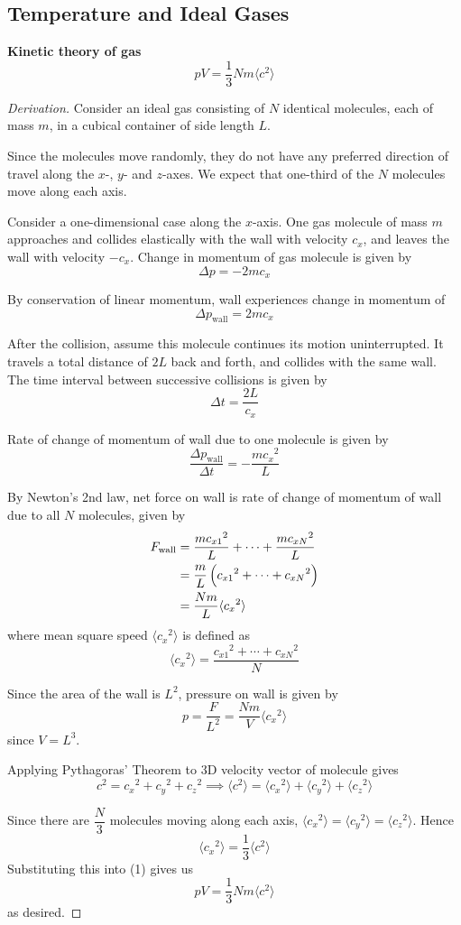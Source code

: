 \subsection{Temperature and Ideal Gases}
\textbf{Kinetic theory of gas}
\[ pV = \frac{1}{3} Nm \langle c^2 \rangle \]
\begin{proof}[Derivation]
Consider an ideal gas consisting of $N$ identical molecules, each of mass $m$, in a cubical container of side length $L$.

Since the molecules move randomly, they do not have any preferred direction of travel along the $x$-, $y$- and $z$-axes. We expect that one-third of the $N$ molecules move along each axis.

Consider a one-dimensional case along the $x$-axis. One gas molecule of mass $m$ approaches and collides elastically with the wall with velocity $c_x$, and leaves the wall with velocity $-c_x$. Change in momentum of gas molecule is given by 
\[ \Delta p = -2mc_x \]

By conservation of linear momentum, wall experiences change in momentum of
\[ \Delta p_\text{wall} = 2mc_x \]

After the collision, assume this molecule continues its motion uninterrupted. It travels a total distance of $2L$ back and forth, and collides with the same wall. The time interval between successive collisions is given by 
\[ \Delta t = \frac{2L}{c_x} \]

Rate of change of momentum of wall due to one molecule is given by 
\[ \frac{\Delta p_\text{wall}}{\Delta t} = -\frac{m{c_x}^2}{L} \]

By Newton's 2nd law, net force on wall is rate of change of momentum of wall due to all $N$ molecules, given by
\begin{align*}
F_\text{wall} &= \frac{m{c_{x1}}^2}{L} + \cdots + \frac{m{c_{xN}}^2}{L} \\
&= \frac{m}{L}\left({c_{x1}}^2 + \cdots + {c_{xN}}^2\right) \\
&= \frac{Nm}{L}\langle {c_x}^2 \rangle
\end{align*}
where mean square speed $\langle {c_x}^2 \rangle$ is defined as
\[ \langle {c_x}^2 \rangle = \frac{{c_{x1}}^2 + \cdots + {c_{xN}}^2}{N} \]

Since the area of the wall is $L^2$, pressure on wall is given by 
\begin{equation*}\tag{1}
p = \frac{F}{L^2} = \frac{Nm}{V}\langle {c_x}^2 \rangle
\end{equation*}
since $V=L^3$.

Applying Pythagoras' Theorem to 3D velocity vector of molecule gives
\[ c^2={c_x}^2+{c_y}^2+{c_z}^2 \implies \langle c^2 \rangle = \langle {c_x}^2 \rangle + \langle {c_y}^2 \rangle + \langle {c_z}^2 \rangle \]

Since there are $\dfrac{N}{3}$ molecules moving along each axis, $\langle {c_x}^2 \rangle = \langle {c_y}^2 \rangle = \langle {c_z}^2 \rangle$. Hence
\[ \langle {c_x}^2 \rangle = \frac{1}{3}\langle c^2 \rangle \]
Substituting this into (1) gives us
\[ pV = \frac{1}{3} Nm \langle c^2 \rangle \]
as desired.
\end{proof}

